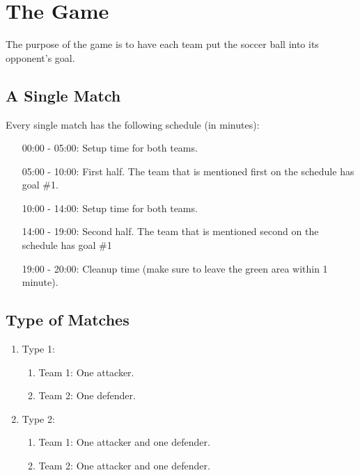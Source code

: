 \documentclass[a4paper, 12pt, oneside]{article}
\title{\titleVariable}
\author{\authorVariable}
\date{\centering First release: \firstRelease \\ Last modification: \today}
\begin{document}
\maketitle

\section{The Game}

The purpose of the game is to have each team put the soccer ball into its opponent's goal.

\subsection{A Single Match}

Every single match has the following schedule (in minutes):

\begin{enumerate}
    \item[00:00 - 05:00:] Setup time for both teams.
    \item[05:00 - 10:00:] First half. 
        The team that is mentioned first on the schedule has goal \#1.
    \item[10:00 - 14:00:] Setup time for both teams.
    \item[14:00 - 19:00:] Second half. 
        The team that is mentioned second on the schedule has goal \#1
    \item[19:00 - 20:00:] Cleanup time (make sure to leave the green area within 1 minute).
\end{enumerate}

\subsection{Type of Matches}

\begin{enumerate}
    \item Type 1:
    \begin{enumerate}
        \item Team 1: One attacker.
        \item Team 2: One defender.
    \end{enumerate}
    \item Type 2:
    \begin{enumerate}
        \item Team 1: One attacker and one defender.
        \item Team 2: One attacker and one defender.
    \end{enumerate}
\end{enumerate}
\end{document}
